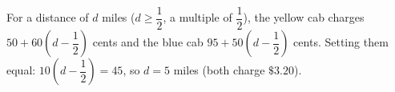 For a distance of $d$ miles ($d\ge\dfrac{1}{2}$, a multiple of $\dfrac{1}{2}$), the yellow cab charges $50+60\left(d-\dfrac{1}{2}\right)$ cents and the blue cab $95+50\left(d-\dfrac{1}{2}\right)$ cents. Setting them equal: $10\left(d-\dfrac{1}{2}\right)=45$, so $d=\boxed{5}$ miles (both charge $\$3.20$).
